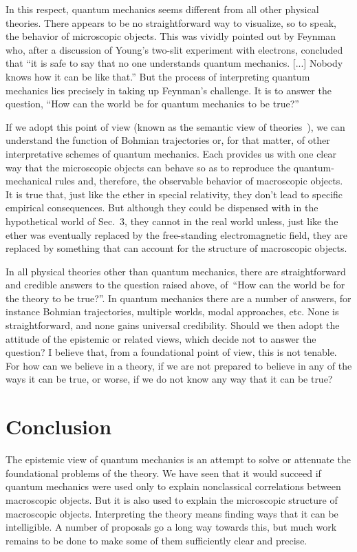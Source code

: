 \documentclass[12pt]{article}
\begin{document}
In this respect, quantum mechanics seems different
from all other physical theories.  There appears to be
no straightforward way to visualize, so to speak,
the behavior of microscopic objects.  This was vividly pointed
out by Feynman~\cite[p.~129]{feynman} who,
after a discussion of Young's
two-slit experiment with electrons, concluded that
``it is safe to say that no one understands quantum
mechanics.  [...] Nobody knows how it can be like
that.''  But the process of interpreting quantum mechanics
lies precisely in taking up Feynman's challenge.
It is to answer the question, ``How can the world
be for quantum mechanics to be true?''

If we adopt this point of view (known as the
semantic view of theories~\cite{giere,suppe}),
we can understand
the function of Bohmian trajectories or, for that matter, of
other interpretative schemes of quantum mechanics.
Each provides us with one clear way that the microscopic
objects can behave so as to
reproduce the quantum-mechanical rules and,
therefore, the observable behavior of macroscopic
objects.  It is true that, just like the
ether in special relativity, they don't lead to
specific empirical consequences.  But although they
could be dispensed with in the hypothetical world
of Sec.~3, they cannot in the real
world unless, just like the ether was eventually
replaced by the free-standing electromagnetic
field, they are replaced by something that
can account for the structure of macroscopic
objects.

In all physical theories other than quantum mechanics,
there are straightforward and credible answers to the
question raised above, of \,``How can the world be for the
theory to be true?''.  In quantum mechanics there
are a number of answers, for instance Bohmian
trajectories, multiple worlds, modal approaches, etc.
None is straightforward, and none gains universal
credibility.  Should we then adopt the attitude
of the epistemic or related views, which decide
not to answer the question?  I believe that, from
a foundational point of view, this is not tenable.
For how can we believe in a theory, if we are not
prepared to believe in any of the ways it can be
true, or worse, if we do not know any way that it can
be true?
%
\section{Conclusion}
%
The epistemic view of quantum mechanics is an
attempt to solve or attenuate the foundational
problems of the theory.  We have seen that it would
succeed if quantum mechanics were used only to explain
nonclassical correlations between macroscopic
objects.  But it is also used to explain the
microscopic structure of macroscopic objects.
Interpreting the theory means finding ways that it
can be intelligible.  A number of proposals go a long
way towards this, but much work remains to be done to make
some of them sufficiently clear and precise.
%
\end{document}
